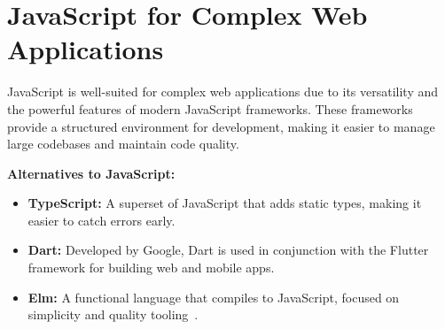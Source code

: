 

\newpage
\section{JavaScript for Complex Web Applications}

JavaScript is well-suited for complex web applications due to its versatility and the powerful features of modern JavaScript frameworks. These frameworks provide a structured environment for development, making it easier to manage large codebases and maintain code quality.

\textbf{Alternatives to JavaScript:}
\begin{itemize}
    \item \textbf{TypeScript:} A superset of JavaScript that adds static types, making it easier to catch errors early.
    \item \textbf{Dart:} Developed by Google, Dart is used in conjunction with the Flutter framework for building web and mobile apps.
    \item \textbf{Elm:} A functional language that compiles to JavaScript, focused on simplicity and quality tooling~\cite{mdn-js-guide}.
\end{itemize}




